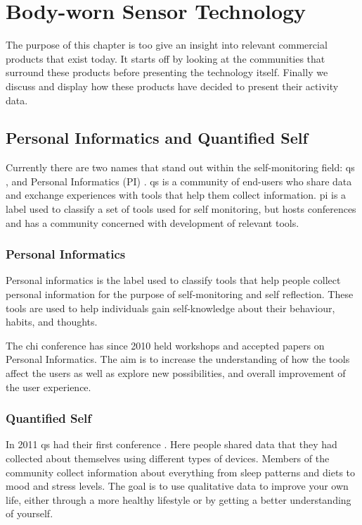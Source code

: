 \chapter{Body-worn Sensor Technology}
The purpose of this chapter is too give an insight into relevant commercial products that exist today. It starts off by looking at the communities that surround these products before presenting the technology itself. Finally we discuss and display how these products have decided to present their activity data.

\section{Personal Informatics and Quantified Self}
Currently there are two names that stand out within the self-monitoring field: \gls{qs} \cite{quantifiedSelf}, and Personal Informatics (PI) \cite{personalInformatics}. \gls{qs} is a community of end-users who share data and exchange experiences with tools that help them collect information. \gls{pi} is a label used to classify a set of tools used for self monitoring, but hosts conferences and has a community concerned with development of relevant tools.

\subsection{Personal Informatics}
Personal informatics is the label used to classify tools that help people collect personal information for the purpose of self-monitoring and self reflection. These tools are used to help individuals gain self-knowledge about their behaviour, habits, and thoughts.

The \gls{chi} conference has since 2010 \cite{chi2010} held workshops and accepted papers on Personal Informatics. The aim is to increase the understanding of how the tools affect the users as well as explore new possibilities, and overall improvement of the user experience.

\subsection{Quantified Self}
In 2011 \gls{qs} had their first conference \cite{bodyHackers}. Here people shared data that they had collected about themselves using different types of devices. Members of the community collect information about everything from sleep patterns and diets to mood and stress levels. The goal is to use qualitative data to improve your own life, either through a more healthy lifestyle or by getting a better understanding of yourself. 

